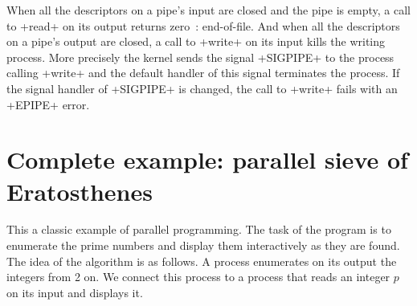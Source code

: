 When all the descriptors on a pipe's input are closed and the pipe is
empty, a call to \ml+read+ on its output returns zero~:
end-of-file. And when all the descriptors on a pipe's output are
closed, a call to \ml+write+ on its input kills the writing
process. More precisely the kernel sends the signal \ml+SIGPIPE+ to
the process calling \ml+write+ and the default handler of this signal
terminates the process. If the signal handler of \ml+SIGPIPE+ is
changed, the call to \ml+write+ fails with an \ml+EPIPE+ error.

\section{Complete example: parallel sieve of Eratosthenes}
\label{ex/crible}

This a classic example of parallel programming. The task of the
program is to enumerate the prime numbers and display them
interactively as they are found. The idea of the algorithm is as
follows. A process enumerates on its output the integers from 2 on. We
connect this process to a  process that reads an
integer $p$ on its input and displays it.


